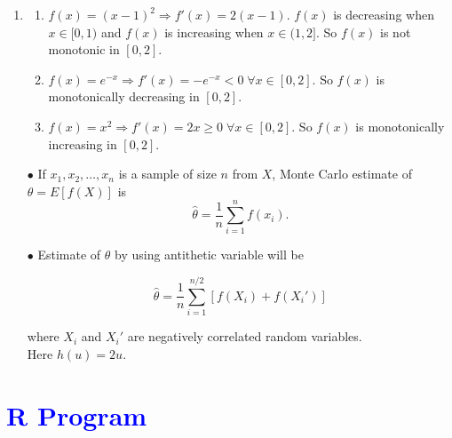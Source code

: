 \documentclass[11pt, a4paper]{article}\usepackage[]{graphicx}\usepackage[]{xcolor}
\begin{document}
\begin{enumerate}

\item[\scalebox{2.0}{\twemoji{keycap: 1}}] 

\begin{enumerate}
\item $f(x) = (x - 1)^2 \Rightarrow f'(x) = 2(x - 1)$. $f(x)$ is decreasing when $x \in [0, 1)$ and $f(x)$ is increasing when $x \in (1, 2]$. So $f(x)$ is not monotonic in $[0, 2]$.

\vspace{1em}

\item $f(x) = e^{-x} \Rightarrow f'(x) = - e^{-x} < 0 \; \forall x \in [0, 2]$. So $f(x)$ is monotonically decreasing in $[0, 2]$.

\vspace{1em}

\item $f(x) = x^2 \Rightarrow f'(x) = 2x \geq 0 \; \forall x \in [0, 2]$. So $f(x)$ is monotonically increasing in $[0, 2]$.
\end{enumerate}

\vspace{1em}

$\bullet$ If $x_1, x_2, \ldots, x_n$ is a sample of size $n$ from $X$, Monte Carlo estimate of $\theta = E[f(X)]$ is $$\widehat{\theta} = \dfrac{1}{n} \sum \limits_{i = 1}^{n} f(x_i).$$

$\bullet$ Estimate of $\theta$ by using antithetic variable will be

$$\widehat{\theta} = \dfrac{1}{n} \sum \limits_{i = 1}^{n/2} [f(X_i) + f(X_i')]$$

where $X_i$ and $X_i'$ are negatively correlated random variables. \\[0.5em]

Here $h(u) = 2u$.

\end{enumerate}

\newpage

\section*{\faArrowAltCircleRight[regular] \textcolor{blue}{R Program}}
\end{document}
